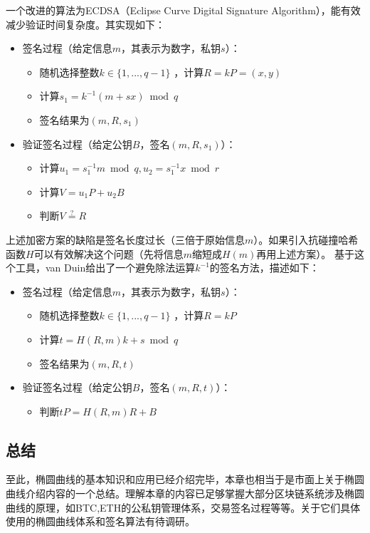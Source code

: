 \documentclass[12pt]{article}
\newcommand{\ec}{椭圆曲线}
\begin{document}
一个改进的算法为ECDSA（Eclipse Curve Digital Signature Algorithm），能有效减少验证时间复杂度。其实现如下：
\begin{itemize}
	\item 签名过程（给定信息$m$，其表示为数字，私钥$s$）：
	\begin{itemize}
		\item 随机选择整数$k \in \{1,...,q-1\}$ ，计算$R=kP=(x,y)$
		\item 计算$s_1=k^{-1}(m+sx) \bmod q$
		\item 签名结果为$(m,R,s_1)$
	\end{itemize}
	\item 验证签名过程（给定公钥$B$，签名$(m,R,s_1)$）：
   \begin{itemize}
      \item 计算$u_1=s_1^{-1}m \bmod q, u_2=s_1^{-1}x \bmod r	$
      \item 计算$V=u_1P+u_2B$
      \item 判断$V \overset{?}{=} R$
   	\end{itemize}
\end{itemize}
上述加密方案的缺陷是签名长度过长（三倍于原始信息$m$）。如果引入抗碰撞哈希函数$H$可以有效解决这个问题（先将信息$m$缩短成$H(m)$再用上述方案）。
基于这个工具，van Duin给出了一个避免除法运算$k^{-1}$的签名方法，描述如下：
\begin{itemize}
	\item 签名过程（给定信息$m$，其表示为数字，私钥$s$）：
	\begin{itemize}
			\item 随机选择整数$k \in \{1,...,q-1\}$ ，计算$R=kP$
			\item 计算$t=H(R,m)k+s \bmod q$
			\item 签名结果为$(m,R,t)$
	\end{itemize}
   	\item 验证签名过程（给定公钥$B$，签名$(m,R,t)$）：
   \begin{itemize}
   	   \item 判断$tP = H(R,m)R+B$
   \end{itemize}
\end{itemize}
\subsection{总结}
至此，椭圆曲线的基本知识和应用已经介绍完毕，本章也相当于是市面上关于\ec 介绍内容的一个总结。理解本章的内容已足够掌握大部分区块链系统涉及\ec 的原理，如BTC,ETH的公私钥管理体系，交易签名过程等等。关于它们具体使用的\ec 体系和签名算法有待调研。
\end{document}
